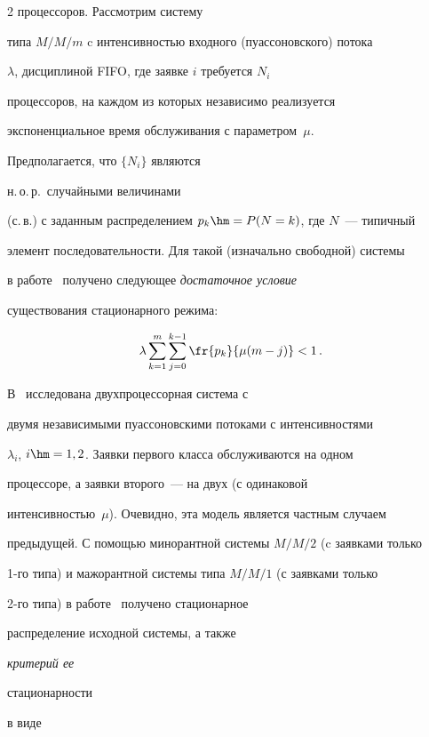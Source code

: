 \begin{multicols}{2}
процессоров. Рассмотрим систему

типа $M/M/m$ c интенсивностью входного (пуассоновского)  потока

$\lambda$, дисциплиной FIFO, где заявке $i$ требуется $N_i$

процессоров, на каждом из которых независимо реализуется

экспоненциальное  время обслуживания с параметром~$\mu$.

Предполагается, что  $\{N_i\}$ являются

н.\,о.\,р.\ случайными величинами

(с.\,в.)  с заданным распределением $p_k\hm=P(N=k)$, где  $N$~--- типичный

элемент последовательности. Для такой (изначально свободной) системы

в работе~\cite{green80} получено следующее {\it достаточное условие}

существования стационарного режима:

\begin{equation}

\label{green-stab3}

\lambda \sum\limits_{k=1}^m\sum_{j=0}^{k-1}

\fr{p_k}{\mu(m-j)}<1\,.

\end{equation}

В~\cite{brill-green84}  исследована  двухпроцессорная сис\-те\-ма с

двумя  независимыми пуассоновскими потоками с интенсивностями

$\lambda_i$, $i\hm=1,2$. Заявки первого класса обслуживаются на одном

процессоре, а заявки второго~--- на двух (с одинаковой

интенсивностью~$\mu$). Очевидно, эта модель является частным случаем

предыдущей. С помощью минорантной системы $M/M/2$ (c заявками только

1-го типа) и мажорантной системы типа $M/M/1$ (с заявками только

2-го типа) в работе~\cite{brill-green84} получено стационарное

распределение исходной системы, а также {\it критерий ее

стационарности}  в виде

\begin{equation}

\label{green-stab4}


\end{equation}
\end{multicols}
